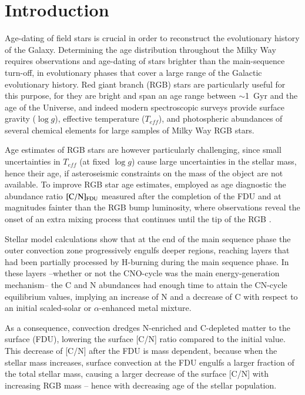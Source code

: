 \documentclass[a4paper,fleqn,usenatbib]{mnras}
\begin{document}
\section{Introduction}
 Age-dating of field stars is crucial in order to reconstruct the evolutionary history of the Galaxy. Determining the age distribution throughout the Milky Way requires observations and age-dating of stars brighter than the main-sequence turn-off, in evolutionary phases that cover a large range of the Galactic evolutionary history. 
Red giant branch (RGB) stars are particularly useful for this purpose, for they are bright and span an age range between $\sim$1~Gyr 
and the age of the Universe, and indeed modern spectroscopic surveys \citep[e.g., the {\sl Gaia}-ESO and the Apache Point Observatory Galactic Evolution Experiment --APOGEE-- surveys, see ][]{gilmore2012, holtzman2015} provide surface gravity ($\log g$), effective temperature ($T_{eff}$), and photospheric abundances of several chemical elements for large samples of Milky Way RGB stars.
 
Age estimates of RGB stars are however particularly challenging, since small uncertainties in $T_{eff}$ (at fixed $\log g$) cause large uncertainties in the stellar mass, hence their age, if asteroseismic constraints on the mass of the object are not available. 
To improve RGB star age estimates, \citet{masseron2015} employed as age diagnostic the abundance ratio ${\rm [C/N]_{FDU}}$ measured after the completion of the FDU and at magnitudes fainter than the RGB bump luminosity, where observations reveal the onset of an extra mixing process that continues until the tip of the RGB \citep[and beyond -- see, e.g.,]
[for more details]{salaris2015}. 

Stellar model calculations show that at the end of the main sequence phase the outer convection zone progressively engulfs deeper regions, reaching layers that had been partially processed by H-burning during the main sequence phase.
In these layers --whether or not the CNO-cycle was the main energy-generation mechanism-- the C and N abundances had enough time to attain the CN-cycle equilibrium values, implying an increase of N and a decrease of C with respect to an initial scaled-solar or
$\alpha$-enhanced metal mixture.

As a consequence, convection dredges N-enriched and C-depleted matter to the surface (FDU),
lowering the surface [C/N] ratio compared to the initial value. This decrease of [C/N] after the FDU is mass dependent, because when the stellar mass increases, surface convection at the FDU engulfs a larger fraction of the total stellar mass,  causing a larger decrease of the surface [C/N] with increasing RGB mass -- hence with decreasing age of the stellar population.
\end{document}
